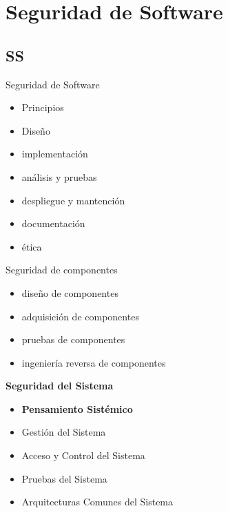 \chapter{Seguridad de Software}
\begin{flushright}
    \textit{ }
\end{flushright}
\section{SS}
Seguridad de Software
    \begin{itemize}
            \item Principios
            \item Diseño
            \item implementación
            \item análisis y pruebas
            \item despliegue y mantención
            \item documentación
            \item ética
            
            
        \end{itemize}
Seguridad de componentes
    \begin{itemize}
            \item diseño de componentes
            \item adquisición de componentes
            \item pruebas de componentes
            \item ingeniería reversa de componentes
        \end{itemize}
\textbf{Seguridad del Sistema}
    \begin{itemize}
    
        \item \textbf{Pensamiento Sistémico}
        \item Gestión del Sistema
        \item Acceso y Control del Sistema
        \item Pruebas del Sistema
        \item Arquitecturas Comunes del Sistema
\end{itemize}



